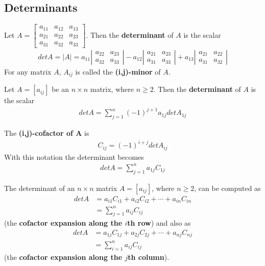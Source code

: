 \documentclass{article}
\begin{document}
\subsection{Determinants}
\begin{definition}
	Let $A=\begin{bmatrix}
			a_{11} & a_{12} & a_{13} \\
			a_{21} & a_{22} & a_{23} \\
			a_{31} & a_{32} & a_{33}
		\end{bmatrix}$.
	Then the \textbf{determinant} of $A$ is the scalar
	\begin{align*}
		det A = |A| = a_{11}\left|\begin{array}{ccc}
			a_{22} & a_{23} \\
			a_{32} & a_{33}
		\end{array}\right| -
		a_{12}\left|\begin{array}{ccc}
			a_{21} & a_{23} \\
			a_{31} & a_{33}
		\end{array}\right| +
		a_{13}\left|\begin{array}{ccc}
			a_{21} & a_{22} \\
			a_{31} & a_{32}
		\end{array}\right|
	\end{align*}
	For any matrix $A$, $A_{ij}$ is called the \textbf{(i,j)-minor} of $A$.
\end{definition}
\begin{definition}
	Let $A=[a_{ij}]$ be an $n\times n$ matrix, where $n\geq 2$. Then the \textbf{determinant} of $A$ is the scalar
	\begin{align*}
		det A = \sum_{j=1}^n (-1)^{j+1}a_{1j}det A_{1j}
	\end{align*}
\end{definition}
\begin{definition}
	The \textbf{(i,j)-cofactor of A} is
	\begin{align*}
		C_{ij}=(-1)^{i+j}det A_{ij}
	\end{align*}
	With this notation the determinant becomes
	\begin{align*}
		det A = \sum^n_{j=1} a_{1j}C_{1j}
	\end{align*}
\end{definition}
\begin{theorem}
	The determinant of an $n\times n$ matrix $A=[a_{ij}]$, where $n\geq 2$, can be computed as
	\begin{align*}
		det A & = a_{i1}C_{i1}+a_{i2}C_{i2} + \cdots + a_{in}C_{in} \\
		      & = \sum_{j=1}^n a_{ij}C_{ij}
	\end{align*}
	(the \textbf{cofactor expansion along the $i$th row}) and also as
	\begin{align*}
		det A & = a_{1j}C_{1j}+a_{2j}C_{2j} + \cdots + a_{nj}C_{nj} \\
		      & = \sum_{i=1}^n a_{ij}C_{ij}
	\end{align*}
	(the \textbf{cofactor expansion along the $j$th column}).
\end{theorem}
\end{document}
